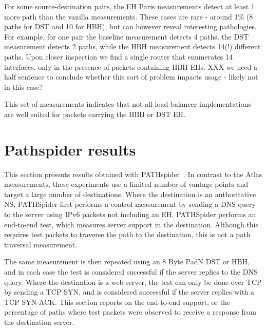 \documentclass[conference]{IEEEtran}
\begin{document}
For some source-destination pairs, the EH Paris measurements detect at least 1 more path than the vanilla measurements. These cases are rare - around 1\% (8 paths for DST and 10 for HBH), but can however reveal interesting pathologies.
For example, for one pair the baseline measurement detects 4 paths, the DST measurement detects 2 paths, while the HBH measurement detects 14(!) different paths. Upon closer inspection we find a single router that enumerates 14 interfaces, only in the presence of packets containing HBH EHs.
XXX we need a half sentence to conclude whether this sort of problem impacts usage - likely not in this case?

This set of measurements indicates that not all load balancer implementations are well suited for packets carrying the HBH or DST EH.


\section{Pathspider results} 
\label{sec:pathspider-results}

This section presents results obtained with PATHspider~\cite{learmonth2016pathspider}. In contrast to the Atlas measurements, these experiments use a limited number of vantage points and target a large number of destinations. Where the destination is an authoritative NS, PATHSpider first performs a control measurement by sending a DNS query to the server using IPv6 packets not including an EH.
PATHSpider performs an end-to-end test, which measures server support in the destination. Although this requires test packets to traverse the path to the destination, this is not a path traversal measurement.

The same measurement is then repeated using an 8 Byte PadN DST or HBH, and in each case the test is considered successful if the server replies to the DNS query. Where the destination is a web server, the test can only be done over TCP by sending a TCP SYN, and is considered successful if the server replies with a TCP SYN-ACK.
This section reports on the end-to-end support, or the percentage of paths where test packets were observed to receive a response from the destination server.
\end{document}
